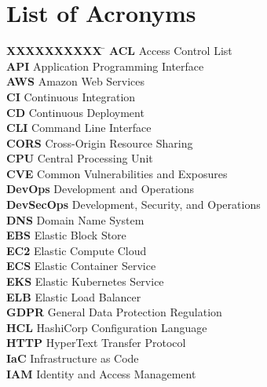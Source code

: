 
\chapter*{List of Acronyms}

\begin{tabbing}
\textbf{XXXXXXXXXX} \= \kill
\textbf{ACL}        \> Access Control List \\[4pt]
\textbf{API}        \> Application Programming Interface \\[4pt]
\textbf{AWS}        \> Amazon Web Services \\[4pt]
\textbf{CI}         \> Continuous Integration \\[4pt]
\textbf{CD}         \> Continuous Deployment \\[4pt]
\textbf{CLI}        \> Command Line Interface \\[4pt]
\textbf{CORS}       \> Cross-Origin Resource Sharing \\[4pt]
\textbf{CPU}        \> Central Processing Unit \\[4pt]
\textbf{CVE}        \> Common Vulnerabilities and Exposures \\[4pt]
\textbf{DevOps}     \> Development and Operations \\[4pt]
\textbf{DevSecOps}  \> Development, Security, and Operations \\[4pt]
\textbf{DNS}        \> Domain Name System \\[4pt]
\textbf{EBS}        \> Elastic Block Store \\[4pt]
\textbf{EC2}        \> Elastic Compute Cloud \\[4pt]
\textbf{ECS}        \> Elastic Container Service \\[4pt]
\textbf{EKS}        \> Elastic Kubernetes Service \\[4pt]
\textbf{ELB}        \> Elastic Load Balancer \\[4pt]
\textbf{GDPR}       \> General Data Protection Regulation \\[4pt]
\textbf{HCL}        \> HashiCorp Configuration Language \\[4pt]
\textbf{HTTP}       \> HyperText Transfer Protocol \\[4pt]
\textbf{IaC}        \> Infrastructure as Code \\[4pt]
\textbf{IAM}        \> Identity and Access Management \\[4pt]

\end{tabbing}
